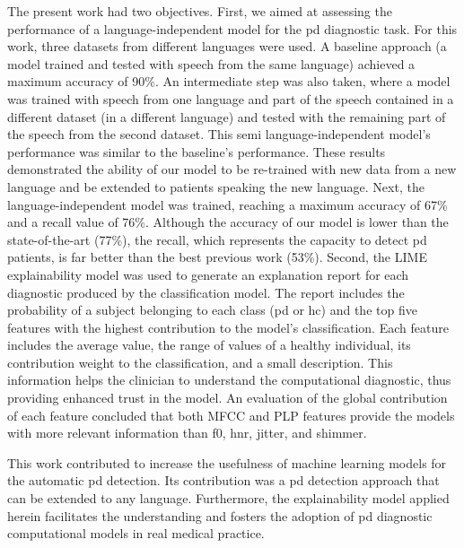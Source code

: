 The present work had two objectives. First, we aimed at assessing the performance of a language-independent model for the \gls{pd} diagnostic task. For this work, three datasets from different languages were used. A baseline approach (a model trained and tested with speech from the same language) achieved a maximum accuracy of 90\%. An intermediate step was also taken, where a model was trained with speech from one language and part of the speech contained in a different dataset (in a different language) and tested with the remaining part of the speech from the second dataset. This semi language-independent model's performance was similar to the baseline's performance. These results demonstrated the ability of our model to be re-trained with new data from a new language and be extended to patients speaking the new language. Next, the language-independent model was trained, reaching a maximum accuracy of 67\% and a recall value of 76\%. Although the accuracy of our model is lower than the state-of-the-art (77\%), the recall, which represents the capacity to detect \gls{pd} patients, is far better than the best previous work (53\%). Second, the LIME explainability model was used to generate an explanation report for each diagnostic produced by the classification model. The report includes the probability of a subject belonging to each class (\gls{pd} or \gls{hc}) and the top five features with the highest contribution to the model's classification. Each feature includes the average value, the range of values of a healthy individual, its contribution weight to the classification, and a small description. This information helps the clinician to understand the computational diagnostic, thus providing enhanced trust in the model. An evaluation of the global contribution of each feature concluded that both MFCC and PLP features provide the models with more relevant information than \gls{f0}, \gls{hnr}, jitter, and shimmer.

This work contributed to increase the usefulness of machine learning models for the automatic \gls{pd} detection. Its contribution was a \gls{pd} detection approach that can be extended to any language. Furthermore, the explainability model applied herein facilitates the understanding and fosters the adoption of \gls{pd} diagnostic computational models in real medical practice.

\newpage


